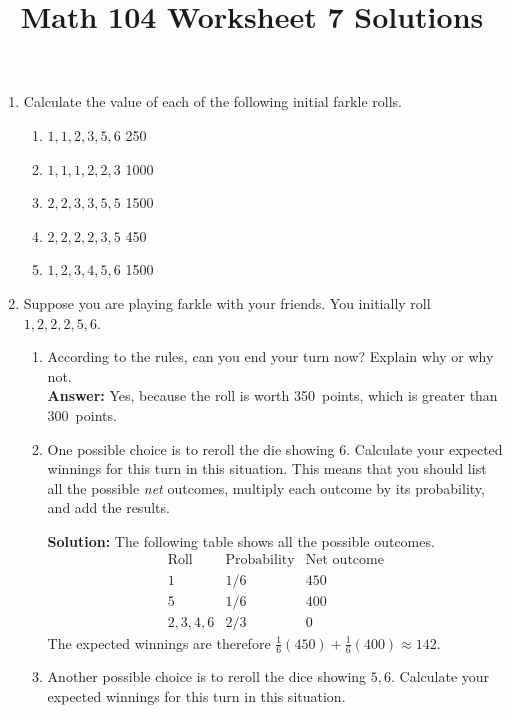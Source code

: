 \documentclass[12pt]{article}
\author{}
\title{Math 104 Worksheet 7 Solutions}
\begin{document}
\maketitle
\thispagestyle{empty}
\begin{enumerate}
\item Calculate the value of each of the following
initial farkle rolls.
\begin{enumerate}
\item $1,1,2,3,5,6$
 250
\item $1,1,1,2,2,3$
 1000
\item $2,2,3,3,5,5$
 1500
\item $2,2,2,2,3,5$
 450
\item $1,2,3,4,5,6$
 1500
\end{enumerate}

\item Suppose you are playing farkle with your
friends. You initially roll $1,2,2,2,5,6$.
\begin{enumerate}
\item\label{Stay}
According to the rules, can you end your turn now?
Explain why or why not.\\
{\bf Answer:} Yes, because the roll is worth 350~points,
which is greater than 300~points.
\item One possible choice is to reroll the die showing 6.
Calculate your expected winnings for this turn in
this situation.
This means that you should list all the possible {\em net}
outcomes, multiply each outcome by its probability,
and add the results.

{\bf Solution:} The following table shows
all the possible outcomes.
\[\begin{array}{ccc}
\text{Roll}&\text{Probability}&\text{Net outcome}\\\hline
1&1/6&450\\
5&1/6&400\\
2,3,4,6&2/3&0
\end{array}\]
The expected winnings are therefore
$\frac{1}{6}\left(450\right)+\frac{1}{6}\left(400\right)
\approx 142$.

\item\label{RollTwo} Another possible choice is to reroll
the dice showing $5,6$.
Calculate your expected winnings for this turn in
this situation.


\end{enumerate}
\end{enumerate}
\end{document}
